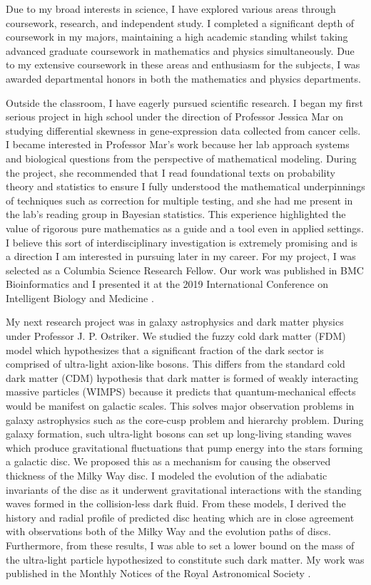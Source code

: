 \documentclass[11pt]{amsart}
\begin{document}
Due to my broad interests in science, I have explored various areas through coursework, research, and independent study. I completed a significant depth of coursework in my majors,  maintaining a high academic standing whilst taking advanced graduate coursework in mathematics and physics simultaneously. Due to my extensive coursework in these areas and enthusiasm for the subjects, I was awarded departmental honors in both the mathematics and physics departments. 
\par 
Outside the classroom, I have eagerly pursued scientific research. I began my first serious project in high school under the direction of Professor Jessica Mar on studying differential skewness in gene-expression data collected from cancer cells. I became interested in Professor Mar's work because her lab approach systems and biological questions from the perspective of mathematical modeling. During the project, she recommended that I read foundational texts on probability theory and statistics to ensure I fully understood the mathematical underpinnings of techniques such as correction for multiple testing, and she had me present in the lab's reading group in Bayesian statistics. This experience highlighted the value of rigorous pure mathematics as a guide and a tool even in applied settings. I believe this sort of interdisciplinary investigation is extremely promising and is a direction I am interested in pursuing later in my career. For my project, I was selected as a Columbia Science Research Fellow. Our work was published in BMC Bioinformatics and I presented it at the 2019 International Conference on Intelligent Biology and Medicine \cite{skew}.
\par 
My next research project was in galaxy astrophysics and dark matter physics under Professor J. P. Ostriker. We studied the fuzzy cold dark matter (FDM) model which hypothesizes that a significant fraction of the dark sector is comprised of ultra-light axion-like bosons. This differs from the standard cold dark matter (CDM) hypothesis that dark matter is formed of weakly interacting massive particles (WIMPS) because it predicts that quantum-mechanical effects would be manifest on galactic scales. This solves major observation problems in galaxy astrophysics such as the core-cusp problem and hierarchy problem. During galaxy formation, such ultra-light bosons can set up long-living standing waves which produce gravitational fluctuations that pump energy into the stars forming a galactic disc. We proposed this as a mechanism for causing the observed thickness of the Milky Way disc. I modeled the evolution of the adiabatic invariants of the disc as it underwent gravitational interactions with the standing waves formed in the collision-less dark fluid. From these models, I derived the history and radial profile of predicted disc heating which are in close agreement with observations both of the Milky Way and the evolution paths of discs. Furthermore, from these results, I was able to set a lower bound on the mass of the ultra-light particle hypothesized to constitute such dark matter. My work was published in the Monthly Notices of the Royal Astronomical Society \cite{FDM}.
\end{document}
